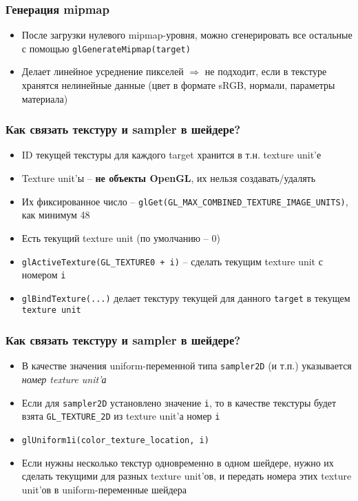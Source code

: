 \documentclass{beamer}
\begin{document}
\begin{frame}[fragile]
\frametitle{Генерация mipmap}
\begin{itemize}
\item После загрузки нулевого mipmap-уровня, можно сгенерировать все остальные с помощью \verb|glGenerateMipmap(target)|
\pause
\item Делает линейное усреднение пикселей \begin{math}\Rightarrow\end{math} не подходит, если в текстуре хранятся нелинейные данные (цвет в формате sRGB, нормали, параметры материала)
\end{itemize}
\end{frame}

\begin{frame}[fragile]
\frametitle{Как связать текстуру и sampler в шейдере?}
\begin{itemize}
\item ID текущей текстуры для каждого target хранится в т.н. texture unit'е
\item Texture unit'ы -- \textbf{не объекты OpenGL}, их нельзя создавать/удалять
\item Их фиксированное число -- \verb|glGet(GL_MAX_COMBINED_TEXTURE_IMAGE_UNITS)|, как минимум 48
\item Есть текущий texture unit (по умолчанию -- 0)
\item \verb|glActiveTexture(GL_TEXTURE0 + i)| -- сделать текущим texture unit с номером \verb|i|
\item \verb|glBindTexture(...)| делает текстуру текущей для данного \verb|target| в текущем \verb|texture unit|
\end{itemize}
\end{frame}

\begin{frame}[fragile]
\frametitle{Как связать текстуру и sampler в шейдере?}
\begin{itemize}
\item В качестве значения uniform-переменной типа \verb|sampler2D| (и т.п.) указывается \textit{номер texture unit'а}
\pause
\item Если для \verb|sampler2D| установлено значение \verb|i|, то в качестве текстуры будет взята \verb|GL_TEXTURE_2D| из texture unit'а номер \verb|i|
\pause
\item \verb|glUniform1i(color_texture_location, i)|
\pause
\item Если нужны несколько текстур одновременно в одном шейдере, нужно их сделать текущими для разных texture unit'ов, и передать номера этих texture unit'ов в uniform-переменные шейдера
\end{itemize}
\end{frame}
\end{document}
